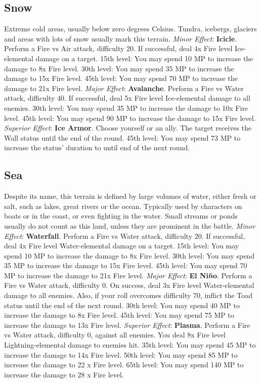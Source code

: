 \begin{multicols}{2}
\subsection{Snow}
\label{subsec:geo-snow}
Extreme cold areas, usually below zero degrees Celsius. Tundra, icebergs, glaciers and areas with lots of snow usually mark this terrain.
\textit{Minor Effect}: \textbf{Icicle}. Perform a Fire vs Air attack, difficulty 20. If successful, deal 4x Fire level Ice-elemental damage on a target. 15th level: You may spend 10 MP to increase the damage to 8x Fire level. 30th level: You may spend 35 MP to increase the damage to 15x Fire level. 45th level: You may spend 70 MP to increase the damage to 21x Fire level.
\textit{Major Effect}: \textbf{Avalanche}. Perform a Fire vs Water attack, difficulty 40. If successful, deal 5x Fire level Ice-elemental damage to all enemies. 30th level: You may spend 35 MP to increase the damage to 10x Fire level. 45th level: You may spend 90 MP to increase the damage to 15x Fire level.
\textit{Superior Effect}: \textbf{Ice Armor}. Choose yourself or an ally. The target receives the Wall status until the end of the round. 45th level: You may spend 73 MP to increase the status’ duration to until end of the next round.

\subsection{Sea}
\label{subsec:geo-sea}
Despite its name, this terrain is defined by large volumes of water, either fresh or salt, such as lakes, great rivers or the ocean. Typically used by characters on boats or in the coast, or even fighting in the water. Small streams or ponds usually do not count as this land, unless they are prominent in the battle.
\textit{Minor Effect}: \textbf{Waterfall}. Perform a Fire vs Water attack, difficulty 20. If successful, deal 4x Fire level Water-elemental damage on a target. 15th level: You may spend 10 MP to increase the damage to 8x Fire level. 30th level: You may spend 35 MP to increase the damage to 15x Fire level. 45th level: You may spend 70 MP to increase the damage to 21x Fire level.
\textit{Major Effect}: \textbf{El Niño}. Perform a Fire vs Water attack, difficulty 0. On success, deal 3x Fire level Water-elemental damage to all enemies. Also, if your roll overcomes difficulty 70, inflict the Toad status until the end of the next round. 30th level: You may spend 40 MP to increase the damage to 8x Fire level. 45th level: You may spend 75 MP to increase the damage to 13x Fire level.
\textit{Superior Effect}: \textbf{Plasma}. Perform a Fire vs Water attack, difficulty 0, against all enemies. You deal 8x Fire level Lightning-elemental damage to enemies hit. 35th level: You may spend 45 MP to increase the damage to 14x Fire level. 50th level: You may spend 85 MP to increase the damage to 22 x Fire level. 65th level: You may spend 140 MP to increase the damage to 28 x Fire level.


\end{multicols}

